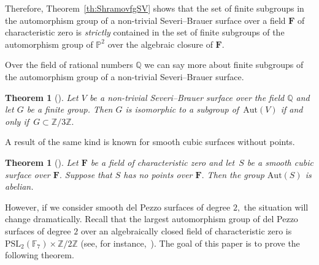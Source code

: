 \documentclass{amsart}
\numberwithin{equation}{section}
\newtheorem{Th}[subsection]{Theorem}
\theoremstyle{definition}
\newcommand{\romsmall}[1]{\romannumeral #1}
\begin{document}
Therefore,  Theorem~\ref{th:ShramovfgSV} shows that  the set of finite subgroups in the automorphism group of a non-trivial Severi--Brauer surface over a field $\mathbf{F}$ of characteristic zero is \textit{strictly} contained  in the set of finite subgroups of the  automorphism group of $\mathbb{P}^2$ over the algebraic closure of $\mathbf{F}$.

Over the field of rational numbers $\mathbb{Q}$ we can say more about finite subgroups of the automorphism group of a non-trivial Severi--Brauer surface.




\begin{Th}[{\cite[Theorem 1.3]{VikulovaSB}}]
Let $V$ be a non-trivial Severi--Brauer surface over the field $\mathbb{Q}$ and let $G$ be a finite group. Then  $G$ is isomorphic to a subgroup of~$\mathrm{Aut}(V)$ if and only if~\mbox{$G \subset \mathbb{Z}/3\mathbb{Z}.$}
\end{Th}





A result of the same kind is known for smooth cubic surfaces without points.  



\begin{Th}[{\cite[Theorem 1.4(\romsmall{1})]{Shramovcubic}}]
Let $\mathbf{F}$ be a field of characteristic zero and let~$S$ be a smooth cubic surface over $\mathbf{F}.$ Suppose that $S$ has no points over $\mathbf{F}.$ Then the group $\mathrm{Aut}(S)$ is abelian.

\end{Th}






However, if we consider smooth del Pezzo surfaces of degree $2,$ the situation will change dramatically.  Recall that the  largest automorphism group of del Pezzo surfaces of degree $2$ over an algebraically closed field of characteristic zero is~$\mathrm{PSL}_2(\mathbb{F}_7) \times \mathbb{Z}/2\mathbb{Z}$  (see, for instance,~\cite[\S~8.7.3]{Dolgachev}). The goal of this paper is to prove the following theorem.
\end{document}

